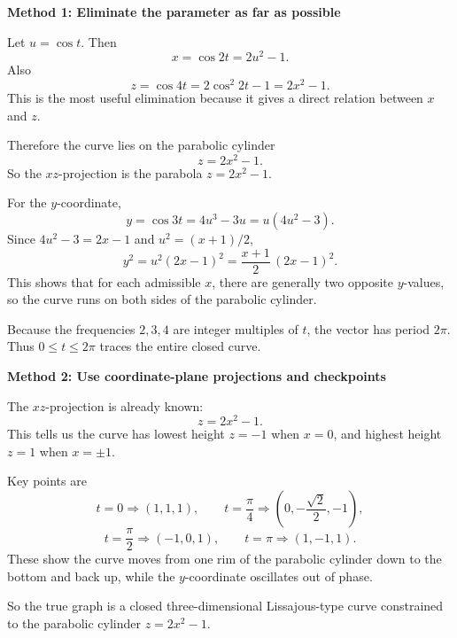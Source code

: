 \documentclass[a4paper,12pt,twocolumn]{article}
\newenvironment{solutionbox}{\begin{framed}}{\end{framed}}
\begin{document}
\begin{solutionbox}
\textbf{Method 1: Eliminate the parameter as far as possible}

\begin{steps}
\item Let \(u=\cos t\). Then
\[
x=\cos 2t=2u^2-1.
\]
Also
\[
z=\cos 4t=2\cos^2 2t-1=2x^2-1.
\]
This is the most useful elimination because it gives a direct relation between \(x\) and \(z\).

\item Therefore the curve lies on the parabolic cylinder
\[
\boxed{z=2x^2-1.}
\]
So the \(xz\)-projection is the parabola \(z=2x^2-1\).

\item For the \(y\)-coordinate,
\[
y=\cos 3t=4u^3-3u=u(4u^2-3).
\]
Since \(4u^2-3=2x-1\) and \(u^2=(x+1)/2\),
\[
y^2=u^2{(2x-1)}^2=\frac{x+1}{2}\,{(2x-1)}^2.
\]
This shows that for each admissible \(x\), there are generally two opposite \(y\)-values, so the curve runs on both sides of the parabolic cylinder.

\item Because the frequencies \(2,3,4\) are integer multiples of \(t\), the vector has period \(2\pi\). Thus \(0\le t\le 2\pi\) traces the entire closed curve.
\end{steps}
\end{solutionbox}

\begin{solutionbox}
\textbf{Method 2: Use coordinate-plane projections and checkpoints}

\begin{steps}
\item The \(xz\)-projection is already known:
\[
z=2x^2-1.
\]
This tells us the curve has lowest height \(z=-1\) when \(x=0\), and highest height \(z=1\) when \(x=\pm1\).

\item Key points are
\[
t=0\Rightarrow (1,1,1),\qquad
t=\frac{\pi}{4}\Rightarrow \left(0,-\frac{\sqrt2}{2},-1\right),
\]
\[
t=\frac{\pi}{2}\Rightarrow (-1,0,1),\qquad
t=\pi\Rightarrow (1,-1,1).
\]
These show the curve moves from one rim of the parabolic cylinder down to the bottom and back up, while the \(y\)-coordinate oscillates out of phase.

\item So the true graph is a closed three-dimensional Lissajous-type curve constrained to the parabolic cylinder \(z=2x^2-1\).
\end{steps}
\end{solutionbox}
\end{document}
